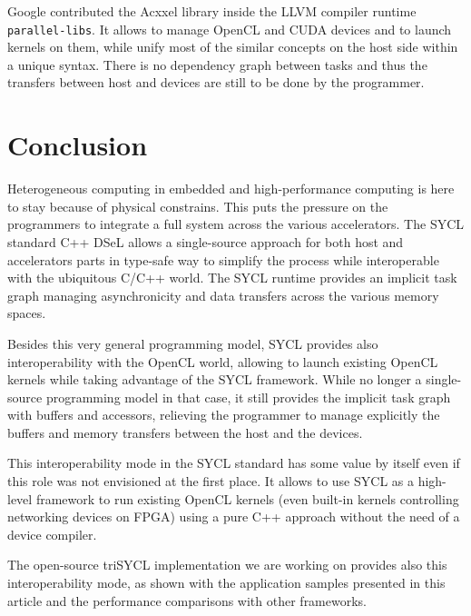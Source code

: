 \documentclass[sigplan, review]{acmart}
\begin{document}
Google contributed the Acxxel library \cite{Acxxel-4.0} inside the
LLVM compiler runtime \texttt{parallel-libs}. It allows to manage
OpenCL and CUDA devices and to launch kernels on them, while unify
most of the similar concepts on the host side within a unique
syntax. There is no dependency graph between tasks and thus the
transfers between host and devices are still to be done by the
programmer.


\section{Conclusion}
\label{sec:conclusion}

Heterogeneous computing in embedded and high-performance computing is
here to stay because of physical constrains. This puts the pressure on
the programmers to integrate a full system across the various
accelerators. The SYCL standard C++ DSeL allows a single-source
approach for both host and accelerators parts in type-safe way to
simplify the process while interoperable with the ubiquitous C/C++
world. The SYCL runtime provides an implicit task graph managing
asynchronicity and data transfers across the various memory spaces.

Besides this very general programming model, SYCL provides also
interoperability with the OpenCL world, allowing to launch existing
OpenCL kernels while taking advantage of the SYCL framework. While no
longer a single-source programming model in that case, it still
provides the implicit task graph with buffers and accessors, relieving
the programmer to manage explicitly the buffers and memory transfers
between the host and the devices.

This interoperability mode in the SYCL standard has some value by
itself even if this role was not envisioned at the first place. It
allows to use SYCL as a high-level framework to run existing OpenCL
kernels (even built-in kernels controlling networking devices on
FPGA) using a pure C++ approach without the need of a device compiler.

The open-source triSYCL implementation \cite{triSYCL} we are working
on provides also this interoperability mode, as shown with the
application samples presented in this article and the performance
comparisons with other frameworks.





\end{document}

